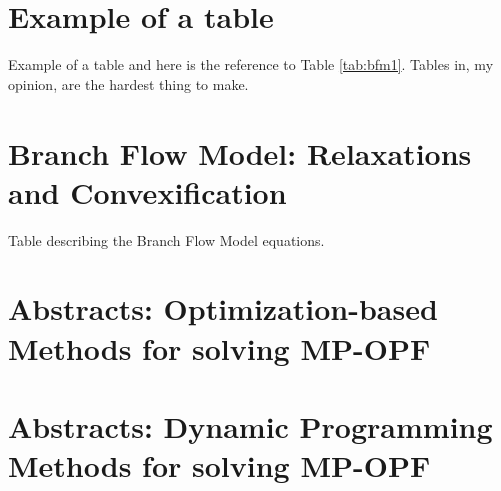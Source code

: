 \appendix

\makeatletter
\renewcommand{\@makechapterhead}[1]{\vspace *{-10\p@ }{\parindent \z@ 
\raggedright \normalfont \ifnum \c@secnumdepth >\m@ne \Huge \bfseries 
\@chapapp \space \thechapter \vskip 10\p@ \fi #1\par \nobreak \vskip 30\p@ }}
\makeatother

\chapter{Example of a table}
Example of a table and here is the reference to Table \ref{tab:bfm1}. Tables in, my opinion, are the hardest thing to make.

\chapter{Branch Flow Model: Relaxations and Convexification}
\begin{table}[!h]
	\caption{Table describing the Branch Flow Model equations.}
	\label{tab:bfm1}
	\centering
	\hspace*{-2cm}
	
\end{table}

\chapter{Abstracts: Optimization-based Methods for solving MP-OPF}
\lipsum

\chapter{Abstracts: Dynamic Programming Methods for solving MP-OPF}
\lipsum